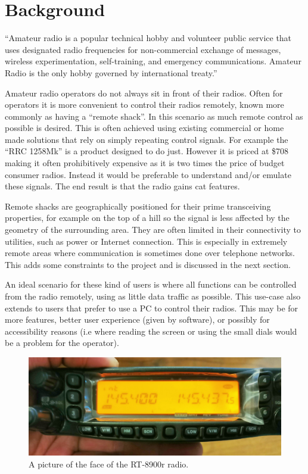 \chapter{Background}

\begin{displayquote}
``Amateur radio is a popular technical hobby and volunteer public service that uses designated radio frequencies for non-commercial exchange of messages, wireless experimentation, self-training, and emergency communications.
Amateur Radio is the only hobby governed by international treaty.'' \cite{def_amateur_radio}
\end{displayquote}

Amateur radio operators do not always sit in front of their radios. Often for operators it is more convenient to control their radios remotely, known more commonly as having a ``remote shack''. In this scenario as much remote control as possible is desired. This is often achieved using existing commercial or home made solutions that rely on simply repeating control signals. For example the ``RRC 1258Mk'' is a product designed to do just. However it is priced at \$708\cite{RRC_1258Mk} making it often prohibitively expensive as it is two times the price of budget consumer radios. Instead it would be preferable to understand and/or emulate these signals. The end result is that the radio gains \gls{cat}\cite{CAT} features.

Remote shacks are geographically positioned for their prime transceiving properties, for example on the top of a hill so the signal is less affected by the geometry of the surrounding area. They are often limited in their connectivity to utilities, such as power or Internet connection. This is especially in extremely remote areas where communication is sometimes done over telephone networks. This adds some constraints to the project and is discussed in the next section.

An ideal scenario for these kind of users is where all functions can be controlled from the radio remotely, using as little data traffic as possible. This use-case also extends to users that prefer to use a PC to control their radios. This may be for more features, better user experience (given by software), or possibly for accessibility reasons (i.e where reading the screen or using the small dials would be a problem for the operator).

\begin{figure}
    \centering
    \includegraphics[width=1\textwidth]{img/radio_head}
    \caption[Picture of RT-8900r radio]{A picture of the face of the RT-8900r radio.}
    \label{fig:radio_head}
\end{figure}

